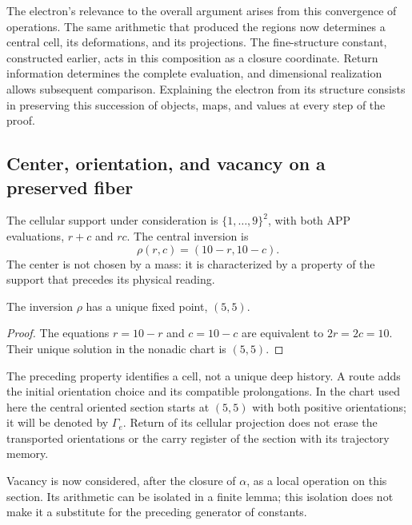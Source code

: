 The electron's relevance to the overall argument arises from this
convergence of operations. The same arithmetic that produced the
regions now determines a central cell, its deformations, and its
projections. The fine-structure constant, constructed earlier, acts
in this composition as a closure coordinate. Return information
determines the complete evaluation, and dimensional realization
allows subsequent comparison. Explaining the electron from its structure
consists in preserving this succession of objects, maps, and values at every
step of the proof.



\subsection{Center, orientation, and vacancy on a preserved fiber}

The cellular support under consideration is \(\{1,\ldots,9\}^2\), with both
APP evaluations, \(r+c\) and \(rc\). The central inversion is
\begin{equation}
 \rho(r,c)=(10-r,10-c).
 \label{x_reciprocidad:eq:el-inversion-central}
\end{equation}
The center is not chosen by a mass: it is characterized by a property of
the support that precedes its physical reading.

\begin{proposition}
The inversion \(\rho\) has a unique fixed point, \((5,5)\).
\end{proposition}
\begin{proof}
The equations \(r=10-r\) and \(c=10-c\) are equivalent to
\(2r=2c=10\). Their unique solution in the nonadic chart is \((5,5)\).
\end{proof}

The preceding property identifies a cell, not a unique deep
history. A route adds the initial orientation choice and its
compatible prolongations. In the chart used here the central oriented
section starts at \((5,5)\) with both positive
orientations; it will be denoted by \(\Gamma_e\). Return of its cellular
projection does not erase the transported orientations or the carry
register of the section with its trajectory memory.

Vacancy is now considered, after the closure of \(\alpha\), as
a local operation on this section. Its arithmetic can be isolated in a
finite lemma; this isolation does not make it a substitute for the
preceding generator of constants.

